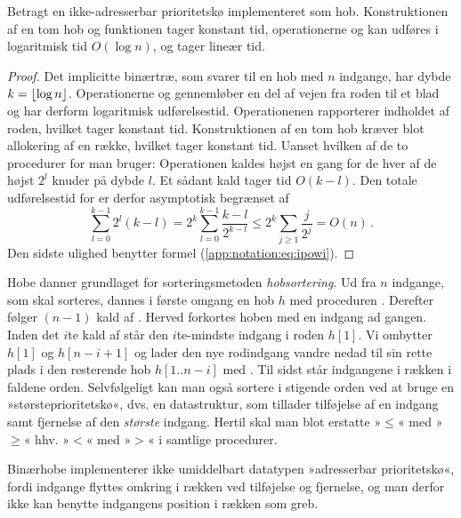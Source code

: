 \begin{thm}\label{heap priority queue}
Betragt en ikke-adresserbar prioritetskø implementeret som hob.
Konstruktionen af en tom hob og funktionen  tager konstant tid, operationerne  og  kan udføres i logaritmisk tid $O(\log n)$, og  tager lineær tid.
\end{thm}
\begin{proof} 
Det implicitte binærtræ, som svarer til en hob med $n$ indgange, har dybde $k = \lfloor \log n\rfloor$.
Operationerne  og  gennemløber en del af vejen fra roden til et blad og har derform logaritmisk udførelsestid.
Operationenen  rapporterer indholdet af roden, hvilket tager konstant tid.
Konstruktionen af en tom hob kræver blot allokering af en række, hvilket tager konstant tid.
Uanset hvilken af de to procedurer for  man bruger:
Operationen  kaldes højst en gang for de hver af de højst $2^l$ knuder på dybde $l$. 
Et sådant kald tager tid $O(k- l)$. 
Den totale udførelsestid for   er derfor asymptotisk begrænset af
\[
	 \sum_{l=0}^{k-1} 2^l (k - l) =
	 2^k \sum_{l=0}^{k-1} \frac{k - l}{2^{k - l}} \leq
	 2^k \sum_{j \ge 1} \frac{j}{2^j} =
	 O(n) \,.
 \]
Den sidste ulighed benytter formel (\ref{app:notation:eq:ipowi}).
\end{proof}

Hobe danner grundlaget for sorteringsmetoden \emph{hobsortering}. 
Ud fra $n$ indgange, som skal sorteres, dannes i første omgang en hob $h$ med proceduren . 
Derefter følger $(n-1)$ kald af .
Herved forkortes hoben med en indgang ad gangen.
Inden det $i$te kald af  står den $i$te-mindste indgang i roden $h[1]$.
Vi ombytter $h[1]$ og $h[n-i+1]$ og lader den nye rodindgang vandre nedad til sin rette plads i den resterende hob $h[1..n-i]$ med  .
Til sidst står indgangene i rækken i faldene orden.
Selvfølgeligt kan man også sortere i stigende orden ved at bruge en »størsteprioritetskø«, dvs. en datastruktur, som tillader tilføjelse af en indgang samt fjernelse af den \emph{største} indgang.
Hertil skal man blot erstatte »$\le$« med »$\ge$« hhv. »$<$« med »$>$« i samtlige procedurer.

Binærhobe implementerer ikke umiddelbart datatypen »adresserbar prioritetskø«, fordi indgange flyttes omkring i rækken ved tilføjelse og fjernelse, og man derfor ikke kan benytte indgangens position i rækken som greb.


